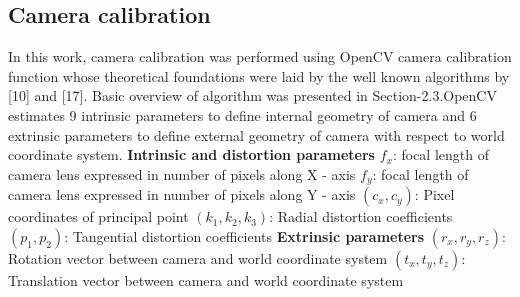 \subsection{Camera calibration}  
In this work, camera calibration was performed using OpenCV camera calibration function whose theoretical foundations were laid by the well known algorithms by [10] and [17]. Basic overview of algorithm was presented in Section-2.3.OpenCV estimates 9 intrinsic parameters to define internal geometry of camera and 6 extrinsic parameters to define external geometry of camera with respect to world coordinate system.\newline  
\textbf{Intrinsic and distortion parameters}\newline  
$f_x$: focal length of camera lens expressed in number of pixels along X - axis\newline  
$f_y$: focal length of camera lens expressed in number of pixels along Y - axis\newline  
$(c_x , c_y)$: Pixel coordinates of principal point\newline  
$(k_1, k_2, k_3)$: Radial distortion coefficients\newline  
$(p_1,p_2)$: Tangential distortion coefficients\newline  
\textbf{Extrinsic parameters}\newline  
$(r_x,r_y,r_z)$: Rotation vector between camera and world coordinate system\newline  
$(t_x,t_y,t_z)$: Translation vector between camera and world coordinate system  
